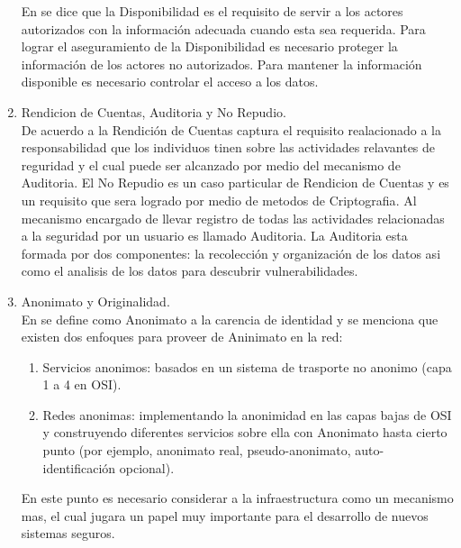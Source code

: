 \documentclass[runningheads,a4paper]{llncs}
\begin{document}
\begin{enumerate}
En \cite{CoSMoIntroduction} se dice que la Disponibilidad es el requisito de servir a los actores autorizados  con la información adecuada cuando esta sea requerida. Para lograr el aseguramiento de la Disponibilidad es necesario proteger la información de los actores no autorizados. Para mantener la información disponible es necesario controlar el acceso a los datos.\\  
	
	\item Rendicion de Cuentas, Auditoria y No Repudio.\\

De acuerdo a \cite{CoSMoIntroduction} la Rendición de Cuentas captura el requisito realacionado a la responsabilidad que los individuos tinen sobre las actividades relavantes de reguridad y el cual puede ser alcanzado por medio del mecanismo de Auditoria. El No Repudio es un caso particular de Rendicion de Cuentas  y es un requisito que sera logrado por medio de metodos de \gls{Criptografia}. Al mecanismo encargado de llevar registro de todas las actividades relacionadas a la seguridad por un usuario es llamado Auditoria. La Auditoria esta formada por dos componentes: la recolección y organización de los datos asi como el analisis de los datos para descubrir vulnerabilidades.\\

	\item Anonimato y Originalidad.\\
	
En \cite{CoSMoIntroduction} se define como Anonimato a la carencia de identidad y se menciona que existen dos enfoques para proveer de Aninimato en la red:\\

	\begin{enumerate}
		\item Servicios anonimos: basados en un sistema de trasporte no anonimo (capa 1 a 4 en \gls{OSI}).
		\item Redes anonimas: implementando la anonimidad en las capas bajas de \gls{OSI} y construyendo diferentes servicios sobre ella con Anonimato hasta cierto punto (por ejemplo, anonimato real, pseudo-anonimato, auto-identificación opcional).\\
	\end{enumerate}

En este punto es necesario considerar a la infraestructura como un mecanismo mas, el cual jugara un papel muy importante para el desarrollo de nuevos sistemas seguros.\\


\end{enumerate}
\end{document}
